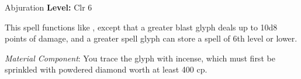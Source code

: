 {Abjuration}
{
	\textbf{Level:}
	Clr 6\\
}
{
	This spell functions like , except that a greater blast glyph deals up to 10d8 points of damage, and a greater spell glyph can store a spell of 6th level or lower.

	\textit{Material Component}:
	You trace the glyph with incense, which must first be sprinkled with powdered diamond worth at least 400 cp.

}
